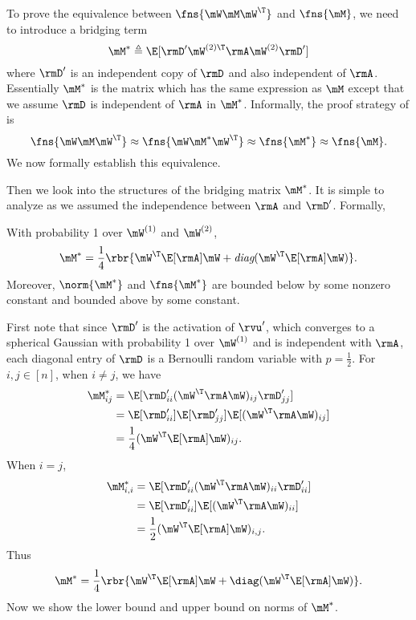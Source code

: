 \begin{proofof}{}
To prove the equivalence between $\fns{\mW\mM\mW^\T}$ and $\fns{\mM}$, we need to introduce a bridging term 
\begin{equation}
    \mM^*\triangleq\E[\rmD'\mW^{(2)\T}\rmA\mW^{(2)}\rmD']
\end{equation}
where $\rmD'$ is an independent copy of $\rmD$ and also independent of $\rmA$. Essentially $\mM^*$ is the matrix which has the same expression as $\mM$ except that we assume $\rmD$ is independent of $\rmA$ in $\mM^*$. Informally, the proof strategy of  is\begin{equation}
    \fns{\mW\mM\mW^\T}\approx \fns{\mW\mM^*\mW^\T}\approx \fns{\mM^*}\approx \fns{\mM}.
\end{equation}
We now formally establish this equivalence.

Then we look into the structures of the bridging matrix $\mM^*$. It is simple to analyze as we assumed the independence between $\rmA$ and $\rmD'$. Formally,
\begin{lemma}
\label{lemma:M-star}
With probability 1 over $\mW^{(1)}$ and $\mW^{(2)}$,
\begin{equation}
\label{eqn:proof-M-star}
\mM^*=\frac14\rbr{\mW^\T\E[\rmA]\mW + \emph{diag}(\mW^\T\E[\rmA]\mW)}.
\end{equation}
Moreover, $\norm{\mM^*}$ and $\fns{\mM^*}$ are bounded below by some nonzero constant and bounded above by some constant.
\end{lemma}
\begin{proofof}{}
First note that since $\rmD'$ is the activation of $\rvu'$, which converges to a spherical Gaussian with probability 1 over $\mW^{(1)}$ and is independent with $\rmA$, each diagonal entry of $\rmD$ is a Bernoulli random variable with $p=\frac12$.
For $i,j\in [n]$, when $i\neq j$, we have\begin{equation}
\begin{split}
\mM^*_{ij} &= \E[\rmD'_{ii}(\mW^\T\rmA\mW)_{ij}\rmD'_{jj}]\\
&= \E[\rmD'_{ii}]\E[\rmD'_{jj}]\E[(\mW^\T\rmA\mW)_{ij}]\\
&= \frac14(\mW^\T\E[\rmA]\mW)_{ij}.
\end{split}
\end{equation}
When $i=j$,
\begin{equation}
\begin{split}
\mM^*_{i,i} &= \E[\rmD'_{ii}(\mW^\T\rmA\mW)_{ii}\rmD'_{ii}]\\
&= \E[\rmD'_{ii}]\E[(\mW^\T\rmA\mW)_{ii}]\\
&= \frac12(\mW^\T\E[\rmA]\mW)_{i,j}.
\end{split}
\end{equation}
Thus\begin{equation}
    \mM^*=\frac14\rbr{\mW^\T\E[\rmA]\mW + \diag(\mW^\T\E[\rmA]\mW)}.
\end{equation}
Now we show the lower bound and upper bound on norms of $\mM^*$.


\end{proofof}
\end{proofof}
